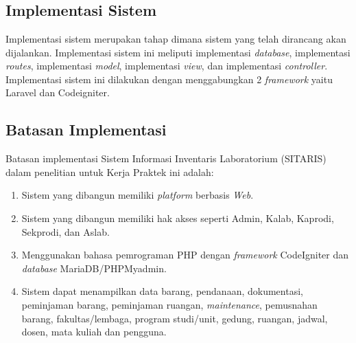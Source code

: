 %
%
%
%

\chapter{\babLima}

\section{Implementasi Sistem}
Implementasi sistem merupakan tahap dimana sistem yang telah dirancang akan dijalankan. Implementasi sistem ini meliputi implementasi \textit{database}, implementasi \textit{routes}, implementasi \textit{model}, implementasi \textit{view}, dan implementasi \textit{controller}. Implementasi sistem ini dilakukan dengan menggabungkan 2 \textit{framework} yaitu Laravel dan Codeigniter.

\section{Batasan Implementasi}
Batasan implementasi Sistem Informasi Inventaris Laboratorium (SITARIS) dalam penelitian untuk Kerja Praktek ini adalah:
\begin{enumerate}
	\item Sistem yang dibangun memiliki \textit{platform} berbasis\textit{ Web}.
	\item Sistem yang dibangun memiliki hak akses seperti Admin, Kalab, Kaprodi, Sekprodi, dan Aslab.
	\item Menggunakan bahasa pemrograman PHP dengan \textit{framework} CodeIgniter dan \textit{database} MariaDB/PHPMyadmin.
	\item Sistem dapat menampilkan data barang, pendanaan, dokumentasi, peminjaman barang, peminjaman ruangan, \textit{maintenance}, pemusnahan barang, fakultas/lembaga, program studi/unit, gedung, ruangan, jadwal, dosen, mata kuliah dan pengguna.
\end{enumerate}

